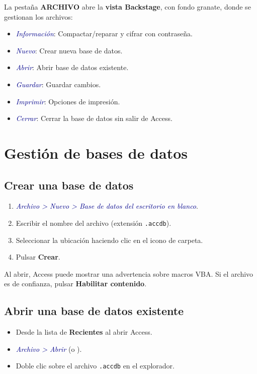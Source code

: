 \documentclass[12pt,a4paper]{article}
\newcommand{\tecla}[1]{\fbox{\small\texttt{#1}}}
\newcommand{\menu}[1]{\textit{\textcolor{darkblue}{#1}}}
\begin{document}
La pestaña \textbf{ARCHIVO} abre la \textbf{vista Backstage}, con fondo granate, donde se gestionan los archivos:
\begin{itemize}
  \item \menu{Información}: Compactar/reparar y cifrar con contraseña.
  \item \menu{Nuevo}: Crear nueva base de datos.
  \item \menu{Abrir}: Abrir base de datos existente.
  \item \menu{Guardar}: Guardar cambios.
  \item \menu{Imprimir}: Opciones de impresión.
  \item \menu{Cerrar}: Cerrar la base de datos sin salir de Access.
\end{itemize}

\section{Gestión de bases de datos}

\subsection{Crear una base de datos}

\begin{enumerate}
  \item \menu{Archivo > Nuevo > Base de datos del escritorio en blanco}.
  \item Escribir el nombre del archivo (extensión \texttt{.accdb}).
  \item Seleccionar la ubicación haciendo clic en el icono de carpeta.
  \item Pulsar \textbf{Crear}.
\end{enumerate}

\begin{nota}
Al abrir, Access puede mostrar una advertencia sobre macros VBA. Si el archivo es de confianza, pulsar \textbf{Habilitar contenido}.
\end{nota}

\subsection{Abrir una base de datos existente}

\begin{itemize}
  \item Desde la lista de \textbf{Recientes} al abrir Access.
  \item \menu{Archivo > Abrir} (o \tecla{Ctrl+A}).
  \item Doble clic sobre el archivo \texttt{.accdb} en el explorador.
\end{itemize}
\end{document}
